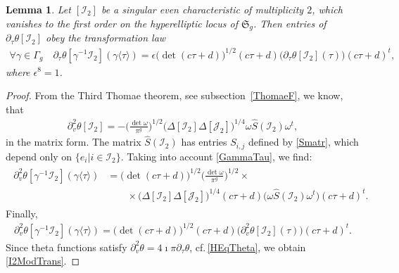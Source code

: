 \documentclass[twoside]{amsart}
\newcommand{\I}{\mathcal{I}}
\newcommand{\J}{\mathcal{J}}
\newtheorem{lemma}{Lemma}[section]
\theoremstyle{definition}
\theoremstyle{plain}
\begin{document}
\begin{lemma}\label{CMFI2}
Let $[\I_2]$ be a singular even characteristic of multiplicity $2$, which vanishes
 to the first order on the hyperelliptic locus of $\mathfrak{S}_g$.
Then entries of $\partial_{\tau} \theta [\I_2 ]$ obey the transformation law
\begin{gather}\label{I2ModTrans}
\forall \gamma\in \Gamma_g \quad
\partial_{\tau} \theta [\gamma^{-1}  \I_2 ] (\gamma \langle \tau \rangle) = 
\epsilon \big(\!\det (c\tau+d) \big)^{1/2} (c\tau+d)
\big( \partial_{\tau} \theta [\I_2 ] (\tau) \big) (c\tau+d)^t,
\end{gather}
where $\epsilon^8=1$.
\end{lemma}
\begin{proof}
From the Third Thomae theorem, see subsection~\ref{ThomaeF}, we know, that
\begin{gather}\label{GSThomaeSng}
\partial^2_{v} \theta [\I_2] = - \Big(\frac{\det \omega}{\pi^g}\Big)^{1/2} 
  \big(\Delta[\I_2] \Delta[\J_2]\big)^{1/4} \omega \hat{S}(\I_2) \omega^t,
\end{gather}
in the matrix form. The matrix $\hat{S}(\I_2)$ has entries $S_{i,j}$ defined by \eqref{Smatr},
which depend only on $\{e_i | i \in \I_2\}$. Taking into account \eqref{GammaTau}, 
we find:
\begin{gather*}
\begin{split}
\partial^2_{v} \theta [\gamma^{-1}  \I_2 ] (\gamma \langle \tau \rangle) &= 
\big(\!\det (c \tau + d) \big)^{1/2} \Big(\frac{\det \omega}{\pi^g}\Big)^{1/2}   \times \\
  &\qquad \times 
  \big(\Delta[\I_2 ] \Delta[\J_2 ]\big)^{1/4} 
  (c \tau + d) \big(\omega \hat{S}( \I_2 ) \omega^t \big) (c \tau + d)^t.
\end{split}
\end{gather*}
Finally,
\begin{gather*}
\partial^2_{v} \theta [\gamma^{-1}  \I_2 ] (\gamma \langle \tau \rangle) = 
\big(\!\det (c \tau + d) \big)^{1/2} (c \tau + d)
\big( \partial^2_{v} \theta [ \I_2 ] (\tau) \big) (c \tau + d)^t.
\end{gather*}
Since theta functions satisfy $\partial^2_{v} \theta = 4\imath \pi \partial_\tau \theta$, 
cf.\,\eqref{HEqTheta}, we obtain \eqref{I2ModTrans}.
\end{proof}
\end{document}
